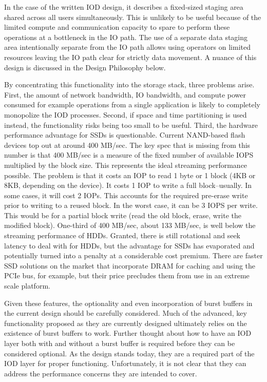 \documentclass[conference]{IEEEtran}
\begin{document}
In the case of the written IOD design, it describes a fixed-sized staging area
shared across all users simultaneously.  This is unlikely to be useful because
of the limited compute and communication capacity to spare to perform these
operations at a bottleneck in the IO path.  The use of a separate data staging
area intentionally separate from the IO path allows using operators on limited
resources leaving the IO path clear for strictly data movement. A nuance of
this design is discussed in the Design Philosophy below.

By concentrating this functionality into the storage stack, three problems
arise.  First, the amount of network bandwidth, IO bandwidth, and compute power
consumed for example operations from a single application is likely to
completely monopolize the IOD processes. Second, if space and time partitioning
is used instead, the functionality risks being too small to be useful. Third,
the hardware performance advantage for SSDs is questionable. Current NAND-based
flash devices top out at around 400 MB/sec. The key spec that is missing from
this number is that 400 MB/sec is a measure of the fixed number of available
IOPS multiplied by the block size. This represents the ideal streaming
performance possible. The problem is that it costs an IOP to read 1 byte or 1
block (4KB or 8KB, depending on the device). It costs 1 IOP to write a full
block--usually. In some cases, it will cost 2 IOPs.  This accounts for the
required pre-erase write prior to writing to a reused block. In the worst case,
it can be 3 IOPS per write. This would be for a partial block write (read the
old block, erase, write the modified block). One-third of 400 MB/sec, about 133
MB/sec, is well below the streaming performance of HDDs.  Granted, there is
still rotational and seek latency to deal with for HDDs, but the advantage for
SSDs has evaporated and potentially turned into a penalty at a considerable
cost premium.  There are faster SSD solutions on the market that incorporate
DRAM for caching and using the PCIe bus, for example, but their price precludes
them from use in an extreme scale platform.

Given these features, the optionality and even incorporation of burst buffers
in the current design should be carefully considered. Much of the advanced, key
functionality proposed as they are currently designed ultimately relies on the
existence of burst buffers to work. Further thought about how to have an IOD
layer both with and without a burst buffer is required before they can be
considered optional. As the design stands today, they are a required part of
the IOD layer for proper functioning. Unfortunately, it is not clear that they
can address the performance concerns they are intended to cover.
\end{document}

